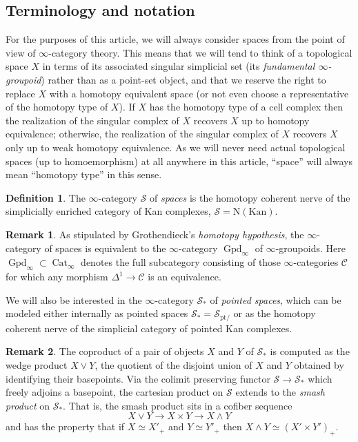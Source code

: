 \documentclass{article}
\theoremstyle{definition}
\newtheorem{definition}{Definition}[subsection]
\newtheorem{remark}{Remark}[subsection]
\newcommand{\C}{\mathcal{C}}
\renewcommand{\S}{\mathcal{S}}
\renewcommand{\i}{\infty}
\newcommand{\too}{\longrightarrow}
\DeclareMathOperator{\Cat}{Cat}
\DeclareMathOperator{\Gpd}{Gpd}
\newcommand{\pt}{\mathrm{pt}}
\begin{document}
\subsection{Terminology and notation}


For the purposes of this article, we will always consider spaces from the point of view of $\infty$-category theory.
This means that we will tend to think of a topological space $X$ in terms of its associated singular simplicial set (its {\em fundamental $\infty$-groupoid})
rather than as a point-set object, and that we reserve the right to replace $X$ with a homotopy equivalent space (or not even choose a representative of the homotopy type of $X$). 
If $X$ has the homotopy type of a cell complex then the realization of the singular complex of $X$ recovers $X$ up to homotopy equivalence; otherwise, the realization of the singular complex of $X$ recovers $X$ only up to weak homotopy equivalence.
As we will never need actual topological spaces (up to homoemorphism) at all anywhere in this article, ``space'' will always mean ``homotopy type'' in this sense. 
\begin{definition}
The $\infty$-category $\S$
\index{$\S$}
of {\em spaces} is the homotopy coherent nerve of the simplicially enriched category of Kan complexes, $\S=\mathrm{N}(\mathrm{Kan})$.
\end{definition}
\begin{remark}
As stipulated by Grothendieck's {\em homotopy hypothesis}, the $\infty$-category of spaces is equivalent to the $\infty$-category $\Gpd_\i$ of $\infty$-groupoids.
Here $\Gpd_\i\subset\Cat_\i$
\index{$\Gpd_\i$}
denotes the full subcategory consisting of those $\infty$-categories $\C$ for which any morphism $\Delta^1\to\C$ is an equivalence.
\end{remark}
We will also be interested in the $\infty$-category $\S_*$ of {\em pointed spaces},
\index{$\S_*$}
which can be modeled either internally as pointed spaces $\S_*=\S_{\pt/}$ or as the homotopy coherent nerve of the simplicial category of pointed Kan complexes.
\begin{remark}
The coproduct of a pair of objects $X$ and $Y$ of $\S_*$ is computed as the wedge product $X\lor Y$, the quotient of the disjoint union of $X$ and $Y$ obtained by identifying their basepoints.
Via the colimit preserving functor $\S\to\S_*$
which freely adjoins a basepoint, the cartesian product on $\S$ extends to the {\em smash product}
on $\S_*$.
That is, the smash product sits in a cofiber sequence
\[
X\lor Y\too X\times Y\too X\land Y
\]
and has the property that if $X\simeq X'_+$ and $Y\simeq Y'_+$ then $X\land Y\simeq (X'\times Y')_+$.
\end{remark}
\end{document}
